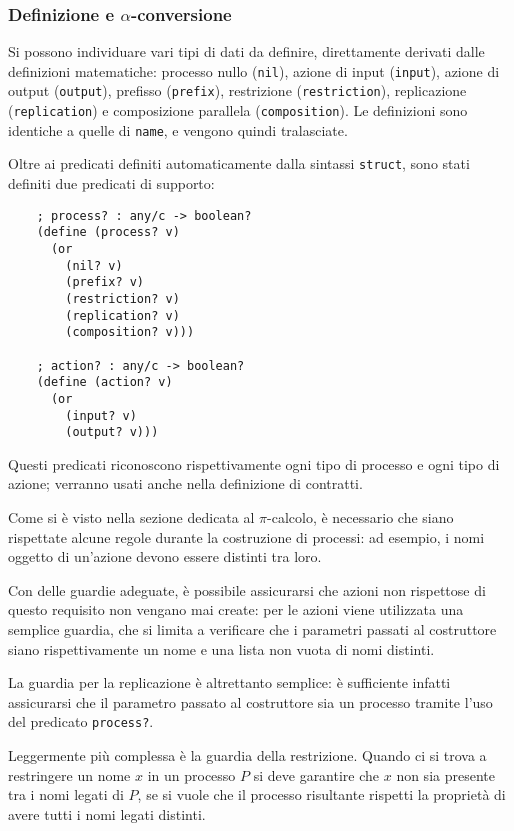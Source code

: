 \subsubsection{Definizione e \texorpdfstring{$\alpha$}{alfa}-conversione}

Si possono individuare vari tipi di dati da definire, direttamente derivati
dalle definizioni matematiche: processo nullo (\lstinline{nil}), azione di
input (\lstinline{input}), azione di output (\lstinline{output}), prefisso
(\lstinline{prefix}), restrizione (\lstinline{restriction}), replicazione
(\lstinline{replication}) e composizione parallela (\lstinline{composition}).
Le definizioni sono identiche a quelle di \lstinline{name}, e vengono quindi
tralasciate.

Oltre ai predicati definiti automaticamente dalla sintassi
\lstinline{struct}, sono stati definiti due predicati di supporto:

\begin{lstlisting}
    ; process? : any/c -> boolean?
    (define (process? v)
      (or
        (nil? v)
        (prefix? v)
        (restriction? v)
        (replication? v)
        (composition? v)))

    ; action? : any/c -> boolean?
    (define (action? v)
      (or
        (input? v)
        (output? v)))

\end{lstlisting}

Questi predicati riconoscono rispettivamente ogni tipo di processo e ogni
tipo di azione; verranno usati anche nella definizione di contratti.

Come si \`e visto nella sezione dedicata al $\pi$-calcolo, \`e necessario
che siano rispettate alcune regole durante la costruzione di processi: ad
esempio, i nomi oggetto di un'azione devono essere distinti tra loro.

Con delle guardie adeguate, \`e possibile assicurarsi che azioni non
rispettose di questo requisito non vengano mai create: per le azioni viene
utilizzata una semplice guardia, che si limita a verificare che i parametri
passati al costruttore siano rispettivamente un nome e una lista non vuota
di nomi distinti.

La guardia per la replicazione \`e altrettanto semplice: \`e sufficiente
infatti assicurarsi che il parametro passato al costruttore sia un processo
tramite l'uso del predicato \lstinline{process?}.

Leggermente pi\`u complessa \`e la guardia della restrizione. Quando ci si
trova a restringere un nome $x$ in un processo $P$ si deve garantire che
$x$ non sia presente tra i nomi legati di $P$, se si vuole che il processo
risultante rispetti la propriet\`a di avere tutti i nomi legati distinti.

